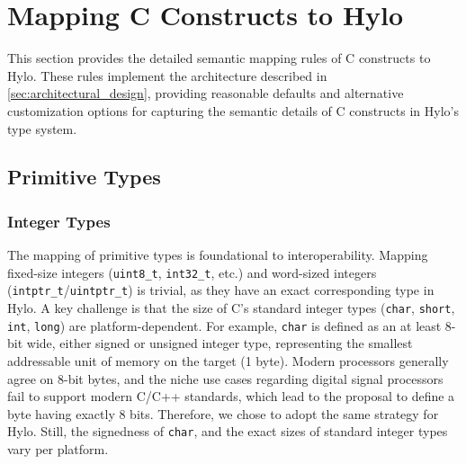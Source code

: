 \section{Mapping C Constructs to Hylo}
\label{sec:mapping_c_constructs}

This section provides the detailed semantic mapping rules of C constructs to Hylo. These rules implement the architecture described in \autoref{sec:architectural_design}, providing reasonable defaults and alternative customization options for capturing the semantic details of C constructs in Hylo's type system.

\subsection{Primitive Types}
\subsubsection{Integer Types}
\label{ssec:integer_types_mapping}
The mapping of primitive types is foundational to interoperability. Mapping fixed-size integers (\texttt{uint8\_t}, \texttt{int32\_t}, etc.) and word-sized integers (\texttt{intptr\_t}/\texttt{uintptr\_t}) is trivial, as they have an exact corresponding type in Hylo. A key challenge is that the size of C's standard integer types (\texttt{char}, \texttt{short}, \texttt{int}, \texttt{long}) are platform-dependent. For example, \texttt{char} is defined as an at least 8-bit wide, either signed or unsigned integer type, representing the smallest addressable unit of memory on the target (1 byte). Modern processors generally agree on 8-bit bytes, and the niche use cases regarding digital signal processors fail to support modern C/C++ standards, which lead to the proposal \cite{P3477R1} to define a byte having exactly 8 bits. Therefore, we chose to adopt the same strategy for Hylo. Still, the signedness of \texttt{char}, and the exact sizes of standard integer types vary per platform.



